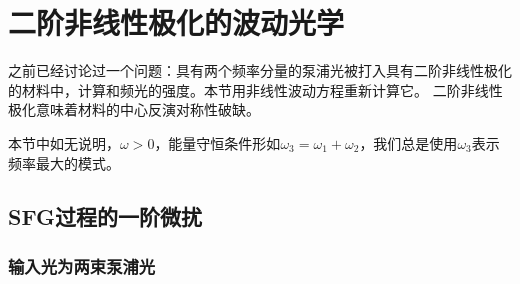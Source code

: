 \section{二阶非线性极化的波动光学}

之前已经讨论过一个问题：具有两个频率分量的泵浦光被打入具有二阶非线性极化的材料中，计算和频光的强度。本节用非线性波动方程重新计算它。
二阶非线性极化意味着材料的中心反演对称性破缺。

本节中如无说明，$\omega>0$，能量守恒条件形如$\omega_3 = \omega_1 + \omega_2$，我们总是使用$\omega_3$表示频率最大的模式。

\subsection{SFG过程的一阶微扰}

\subsubsection{输入光为两束泵浦光}


